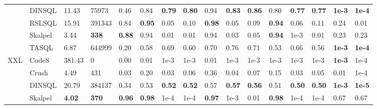 \begin{table}
\begin{tabular}{llllllllllllllll}
 & DINSQL & 11.43 & 75973 & 0.46 & 0.84 & \textbf{0.79} & \textbf{0.80} & 0.94 & \textbf{0.83} & \textbf{0.86} & 0.80 & \textbf{0.77} & \textbf{0.77} & \textbf{1e-3} & \textbf{1e-4} \\
 & RSLSQL & 15.91 & 391343 & 0.84 & \textbf{0.95} & 0.05 & 0.10 & \textbf{0.98} & 0.05 & 0.09 & \textbf{0.94} & 0.06 & 0.11 & 0.24 & 0.01 \\
 & Skalpel & 3.44 & \textbf{338} & \textbf{0.88} & 0.94 & 0.01 & 0.01 & 0.94 & 0.03 & 0.05 & \textbf{0.94} & 1e-3 & 0.01 & 0.23 & 0.23 \\
 & TASQL & 6.87 & 644999 & 0.20 & 0.58 & 0.69 & 0.60 & 0.70 & 0.76 & 0.71 & 0.53 & 0.66 & 0.56 & \textbf{1e-3} & \textbf{1e-4} \\
\cline{1-16}
\multirow[t]{4}{*}{XXL} & CodeS & 381.43 & 0 & 0.00 & 0.01 & 1e-3 & 1e-3 & 0.01 & 1e-3 & 1e-3 & 1e-3 & 1e-3 & 1e-3 & \textbf{1e-3} & 1e-4 \\
 & Crush & 4.49 & 431 & 0.03 & 0.20 & 0.03 & 0.06 & 0.36 & 0.04 & 0.07 & 0.15 & 0.03 & 0.05 & 0.01 & 1e-4 \\
 & DINSQL & 20.79 & 384137 & 0.34 & 0.53 & \textbf{0.52} & \textbf{0.52} & 0.57 & \textbf{0.57} & \textbf{0.56} & 0.51 & \textbf{0.50} & \textbf{0.50} & \textbf{1e-3} & \textbf{1e-5} \\
 & Skalpel & \textbf{4.02} & \textbf{370} & \textbf{0.96} & \textbf{0.98} & 1e-4 & 1e-4 & \textbf{0.97} & 1e-3 & 0.01 & \textbf{0.98} & 1e-4 & 1e-4 & 0.67 & 0.67 \\
\cline{1-16}
\bottomrule
\end{tabular}
\end{table}

